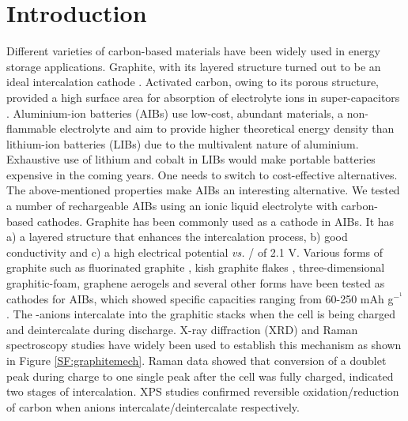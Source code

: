\documentclass{article}
\begin{document}
\section{Introduction}
Different varieties of carbon-based materials have been widely used in energy storage applications. Graphite, with its layered structure turned out to be an ideal intercalation cathode \cite{ji_recent_2011, yoo_large_2008, lian_large_2010}. Activated carbon, owing to its porous structure, provided a high surface area for absorption of electrolyte ions in super-capacitors \cite{eliad_ion_2001, zhu_carbon-based_2011}. Aluminium-ion batteries (AIBs) use low-cost, abundant materials, a non-flammable electrolyte and aim to provide higher theoretical energy density than lithium-ion batteries (LIBs) due to the multivalent nature of aluminium. Exhaustive use of lithium and cobalt in LIBs would make portable batteries expensive in the coming years. One needs to switch to cost-effective alternatives. The above-mentioned properties make AIBs an interesting alternative\cite{ambroz_trends_2017-1}. We tested a number of rechargeable AIBs using an ionic liquid electrolyte with carbon-based cathodes.
Graphite has been commonly used as a cathode in AIBs. It has a) a layered structure that enhances the intercalation process, b) good conductivity and c) a high electrical potential {\it vs.} / of 2.1 V. Various forms of graphite such as fluorinated graphite \cite{rani_fluorinated_2013}, kish graphite flakes \cite{wang_kish_2017}, three-dimensional graphitic-foam\cite{wu_3d_2016}, graphene aerogels\cite{huang_graphene_2019} and several other forms have been tested as cathodes for AIBs, which showed specific capacities ranging from 60-250 mAh g$^-^1$. The -anions intercalate into the graphitic stacks when the cell is being charged and deintercalate during discharge. X-ray diffraction (XRD) and Raman spectroscopy studies have widely been used to establish this mechanism\cite{rani_fluorinated_2013, wang_advanced_2017, lin_ultrafast_2015} as shown in Figure \ref{SF:graphitemech}. Raman data showed that conversion of a doublet peak during charge to one single peak after the cell was fully charged, indicated two stages of intercalation. XPS studies confirmed reversible oxidation/reduction of carbon when  anions intercalate/deintercalate respectively\cite{stadie_zeolite-templated_2017, liu_binder-free_2019,wei_amorphous_2017}.
\end{document}
